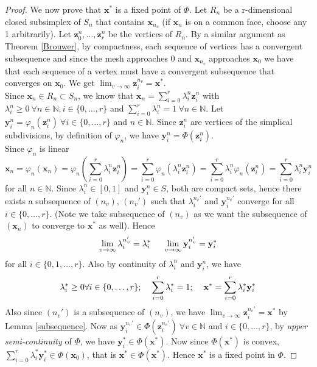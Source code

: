 \documentclass{article}
\theoremstyle{definition}
\begin{document}
\begin{proof}
We now prove that $\mathbf{x}^*$ is a fixed point of $\Phi$. Let $R_n$ be a r-dimensional closed subsimplex of $S_n$ that contains $\mathbf{x}_{n_v}$ (if $\mathbf{x}_n$ is on a common face, choose any 1 arbitrarily). Let $\mathbf{z}^n_0,\dots, \mathbf{z}^n_r$ be the vertices of $R_n$. By a similar argument as Theorem \ref{Brouwer}, by compactness, each sequence of vertices has a convergent subsequence and since the mesh approaches $0$ and $\mathbf{x}_{n_v}$ approaches $\mathbf{x}_0$ we have that each sequence of a vertex must have a convergent subsequence that converges on $\mathbf{x}_0$. We get $\lim_{v\to\infty}\mathbf{z}^{n_v}_i = \mathbf{x}^*$.\\
Since $\mathbf{x}_n \in R_n \subset S_n$, we know that $\mathbf{x}_n = \sum_{i=0}^r \lambda^n_i \mathbf{z}^n_i$ with $\lambda^n_i \geq 0~ \forall n\in \mathbb{N}, i\in \{0,\dots,r\}$ and $\sum_{i=0}^r \lambda^n_i =1~\forall n\in \mathbb{N}$. Let $\mathbf{y}^n_i = \varphi_n(\mathbf{z}^n_i)~\forall i\in \{0,\dots,r\}$ and $n\in \mathbb{N}$. Since $\mathbf{z}^n_i$ are vertices of the simplical subdivisions, by definition of $\varphi_n$, we have $\mathbf{y}^n_i = \Phi(\mathbf{z}^n_i)$.\\
Since $\varphi_n$ is linear $$\mathbf{x}_n = \varphi_n(\mathbf{x}_n) = \varphi_n\left(\sum_{i=0}^r \lambda^n_i \mathbf{z}^n_i\right) = \sum_{i=0}^r \varphi_n(\lambda^n_i \mathbf{z}^n_i) = \sum_{i=0}^r \lambda^n_i \varphi_n(\mathbf{z}^n_i) = \sum_{i=0}^r \lambda^n_i \mathbf{y}^n_i$$ for all $n\in \mathbb{N}$. Since $\lambda^n_i\in [0,1]$ and $\mathbf{y}^n_i\in S$, both are compact sets, hence there exists a subsequence of $(n_v)$, $(n_v')$ such that $\lambda^{n_v'}_i$ and $\mathbf{y}^{n_v'}_i$ converge for all $i\in\{0,\dots,r\}$. (Note we take subsequence of $(n_v)$ as we want the subsequence of $(\mathbf{x}_n)$ to converge to $\mathbf{x}^*$ as well). Hence $$\lim_{v\to\infty}\lambda^{n_v'}_i = \lambda^*_i \hspace{5mm} \lim_{v\to\infty}\mathbf{y}^{n_v'}_i = \mathbf{y}^*_i$$ for all $i\in \{0,1,\dots,r\}$. Also by continuity of $\lambda^n_i$ and $\mathbf{y}^n_i$, we have $$\lambda_i^*\geq 0 \forall i\in\{0,\dots,r\}; \hspace{4mm} \sum_{i=0}^r \lambda_i^* = 1; \hspace{4mm}\mathbf{x}^* =  \sum_{i=0}^r \lambda_i^*\mathbf{y}_i^* $$ Also since $(n_v')$ is a subsequence of $(n_v)$, we have $\lim_{v\to\infty} \mathbf{z}_i^{n_v'} = \mathbf{x}^*$ by Lemma \ref{subsequence}. Now as $\mathbf{y}^{n_v'}_i \in \Phi(\mathbf{z}^{n_v'}_i) ~\forall v\in\mathbb{N}$ and $i\in \{0,\dots,r\}$, by \textit{upper semi-continuity} of $\Phi$, we have $\mathbf{y}^*_i \in \Phi(\mathbf{x}^*)$. Now since $\Phi(\mathbf{x}^*)$ is convex, $\sum_{i=0}^r \lambda^*_i \mathbf{y}^*_i \in \Phi(\mathbf{x}_0)$, that is $\mathbf{x}^*\in \Phi(\mathbf{x}^*)$. Hence $\mathbf{x}^*$ is a fixed point in $\Phi$.
\end{proof}
\end{document}
